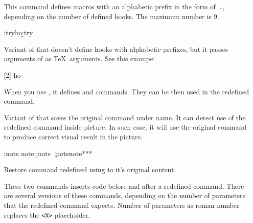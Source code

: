 This command defines macros with an alphabetic prefix in the form of 
 \ldots {}, depending on the number of defined hooks.
The maximum number is 9.

\begin{texsource}
\def\try#1{\a:try#1\b:try}
\try{ho} 
\end{texsource}


Variant of  that doesn't define hooks with 
alphabetic prefixes, but it passes arguments of 
as \TeX\ arguments. See this exampe:

\begin{texsource}
[2]{\def\hookI{#1}\def\hookII{#2}}
\def\try#1{\hookI#1\hookII}
\try{ho} 
\end{texsource}

When you use , it defines  and 
commands. They can be then used in the redefined  command.


Variant of  that saves the original command under  name.
It can detect use of the redefined command inside picture. In such case, it will use
the original command to produce correct visual result in the picture.

\begin{texsource}
\def\:tempa#1{\a:note note:\b:note~#1\c:note}
\HLet\note\:tempa
\Configure{note}{*}{*}{*}
\end{texsource}


Restore command redefined using  to it's original content.



These two commands inserts code before and after a redefined command. There are several
versions of these commands, depending on the number of parameters that the redefined 
command expects. Number of parameters as roman number replaces the \verb|<X>| placeholder. 

